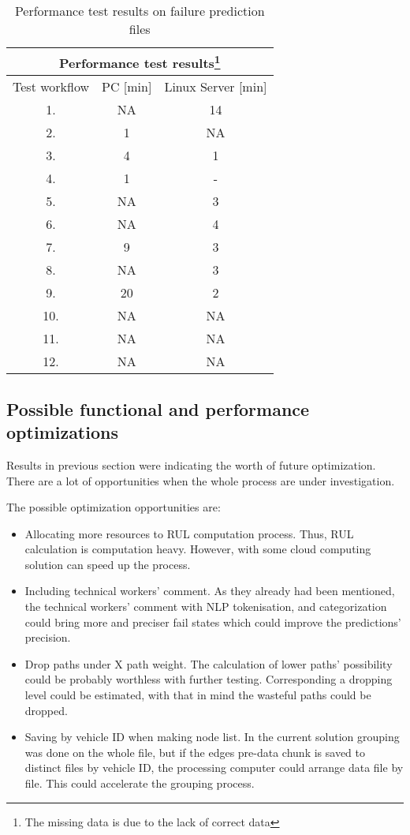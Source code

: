 \begin{table}[H]
\centering
\begin{tabular}{ |c|c|c|  }
\hline
\multicolumn{3}{|c|}{Performance test results\footnote{The missing data is due to the lack of correct data}} \\
\hline
Test workflow& PC [min] & Linux Server [min]\\
\hline
1.& NA & 14 \\
2.& 1 & NA \\
3.& 4 & 1 \\
4.& 1 & - \\
5.& NA & 3 \\
6.& NA & 4 \\
7.& 9 & 3 \\
8.& NA & 3 \\
9.& 20 & 2 \\
10.& NA & NA \\
11.& NA & NA \\
12.& NA & NA \\
\hline
\end{tabular}
\caption{Performance test results on failure prediction files}
\label{table:3}
\end{table}
\subsection{Possible functional and performance optimizations}
Results in previous section were indicating the worth of future optimization. There are a lot of opportunities when the whole process are under investigation.

The possible optimization opportunities are:
\begin{itemize}
	\item{Allocating more resources to RUL computation process.} Thus, RUL calculation is computation heavy. However, with some cloud computing solution can speed up the process.
	\item{Including technical workers' comment.} As they already had been mentioned, the technical workers' comment with NLP tokenisation, and categorization could bring more and preciser fail states which could improve the predictions' precision.
	\item{Drop paths under X path weight.} The calculation of lower paths' possibility could be probably worthless with further testing. Corresponding a dropping level could be estimated, with that in mind the wasteful paths could be dropped.
	\item{Saving by vehicle ID when making node list.} In the current solution grouping was done on the whole file, but if the edges pre-data chunk is saved to distinct files by vehicle ID, the processing computer could arrange data file by file. This could accelerate the grouping process.
\end{itemize} 
